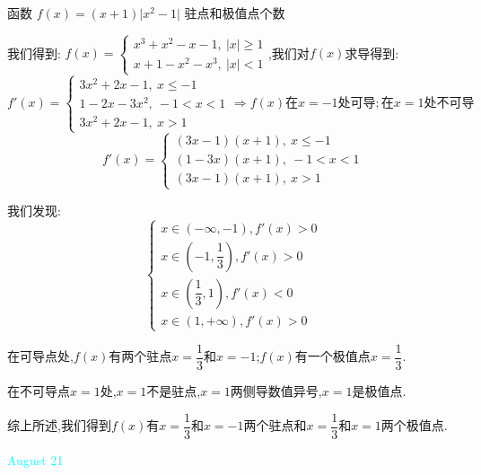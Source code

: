 \begin{example}[][Exam: 34.3.12]
	函数 $f(x)=(x+1)\big|x^2-1\big|$ 驻点和极值点个数
\end{example}

\begin{solution}

	我们得到:  $f(x)=\left\lbrace
	\begin{array}{l}
		x^3+x^2-x-1,\ |x|\geq 1\\
		x+1-x^2-x^3,\ |x|<1
	\end{array}
	\right. $,我们对$f(x)$求导得到:
	$$f'(x)=\left\lbrace
	\begin{array}{l}
		3x^2+2x-1,\ x\leq -1\\
		1-2x-3x^2,\ -1<x<1\\
		3x^2+2x-1,\ x>1
	\end{array}
	\right. \Rightarrow f(x)\text{在}x=-1\text{处可导};\text{在}x=1\text{处不可导}$$
	$$f'(x)=\left\lbrace
	\begin{array}{l}
		(3x-1)(x+1),\ x\leq -1\\
		(1-3x)(x+1),\ -1<x<1\\
		(3x-1)(x+1),\ x>1
	\end{array}
	\right.$$
	
	我们发现:  
	$$\left\lbrace
	\begin{array}{l}
		x\in(-\infty,-1),f'(x)>0\\
		x\in(-1,\dfrac{1}{3}),f'(x)>0\\
		x\in(\dfrac{1}{3},1),f'(x)<0\\
		x\in(1,+\infty),f'(x)>0
	\end{array}
	\right. $$
	
	在可导点处,$f(x)$有两个驻点$x=\dfrac{1}{3}$和$x=-1$;$f(x)$有一个极值点$x=\dfrac{1}{3}$.
	
	在不可导点$x=1$处,$x=1$不是驻点,$x=1$两侧导数值异号,$x=1$是极值点.
	
	综上所述,我们得到$f(x)$有$x=\dfrac{1}{3}$和$x=-1$两个驻点和$x=\dfrac{1}{3}$和$x=1$两个极值点.
	
\end{solution}


\textcolor{cyan}{August 21}

